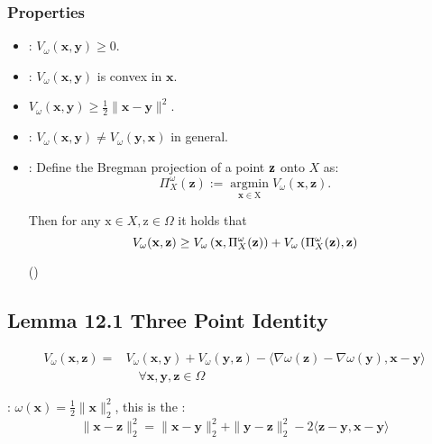 \subsubsection*{Properties}
\begin{itemize}[leftmargin=*]
    \item {}: $V_{\omega}(\mathbf{x}, \mathbf{y}) \geq 0$.
    \item {}: $V_{\omega}(\mathbf{x}, \mathbf{y})$ is convex in $\mathbf{x}$.
    \item $V_{\omega}(\mathbf{x}, \mathbf{y}) \geq \frac{1}{2}\|\mathbf{x}-\mathbf{y}\|^{2}$.
    \item {}: $V_{\omega}(\mathbf{x}, \mathbf{y}) \neq V_{\omega}(\mathbf{y}, \mathbf{x})$ in general.
    \item {}: Define the Bregman projection of a point $\operatorname{\boldsymbol{\mathbf{z}}}$ onto $X$ as:
$$
\Pi_{X}^{\omega}(\mathbf{z}):=\underset{\mathbf{x} \in \mathrm{X}}{\operatorname{argmin}} V_{\omega}(\mathbf{x}, \mathbf{z}) .
$$

Then for any $\mathrm{x} \in X, \mathrm{z} \in \Omega$ it holds that
$$
V_{\omega}(\operatorname{\boldsymbol{\mathbf{x}}}, \operatorname{\boldsymbol{\mathbf{z}}}) \geq V_{\omega}\left(\operatorname{\boldsymbol{\mathbf{x}}}, \Pi_{X}^{\omega}(\operatorname{\boldsymbol{\mathbf{z}}})\right)+V_{\omega}\left(\Pi_{X}^{\omega}(\operatorname{\boldsymbol{\mathbf{z}}}), \operatorname{\boldsymbol{\mathbf{z}}}\right)
$$

()
\end{itemize}






\subsection*{Lemma 12.1 Three Point Identity}
$$
\begin{aligned}
V_{\omega}(\mathbf{x}, \mathbf{z})=& V_{\omega}(\mathbf{x}, \mathbf{y})+V_{\omega}(\mathbf{y}, \mathbf{z})-\langle\nabla \omega(\mathbf{z})-\nabla \omega(\mathbf{y}), \mathbf{x}-\mathbf{y}\rangle \\
& \quad \forall \mathbf{x}, \mathbf{y}, \mathbf{z} \in \Omega
\end{aligned}
$$

: $\omega(\mathbf{x})=\frac{1}{2}\|\mathbf{x}\|_{2}^{2}$, this is the :
$$
\|\mathbf{x}-\mathbf{z}\|_{2}^{2}=\|\mathbf{x}-\mathbf{y}\|_{2}^{2}+\|\mathbf{y}-\mathbf{z}\|_{2}^{2}-2\langle\mathbf{z}-\mathbf{y}, \mathbf{x}-\mathbf{y}\rangle
$$





